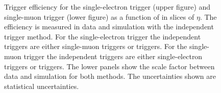 \begin{figure}[htbp!]
  \begin{center}
      \caption{Trigger efficiency for the single-electron trigger (upper figure) and single-muon trigger (lower figure) as a function of \pt in slices of $\eta$. The efficiency is measured in data and simulation with the independent trigger method. For the single-electron trigger the independent triggers are either single-muon triggers or \ETm triggers. For the single-muon trigger the independent triggers are either single-electron triggers or \ETm triggers.
      The lower panels show the scale factor between data and simulation for both methods. The uncertainties shown are statistical uncertainties.}  
    \label{fig:Clos_sil}
  \end{center}
\end{figure}



